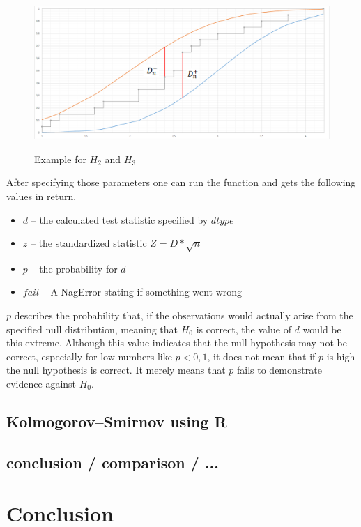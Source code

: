 \documentclass{article}
\begin{document}
\begin{figure}[here]
\caption{Example for $H_2$ and $H_3$}
\center
\includegraphics[width=.99\textwidth]{figures/diagramKSd-d+.png}
\label{fig:2}
\end{figure}
\newpage

After specifying those parameters one can run the function and gets the following values in return.
\begin{itemize}
\item $d$ -- the calculated test statistic specified by $dtype$
\item $z$ -- the standardized  statistic $Z=D*\sqrt n$
\item $p$ -- the probability for $d$
\item $fail$ -- A NagError stating if something went wrong
\end{itemize}
$p$ describes the probability that, if the observations would actually arise from the specified null distribution, meaning that $H_0$ is correct, the value of $d$ would be this extreme. Although this value indicates that the null hypothesis may not be correct, especially for low numbers like $p<0,1$, it does not mean that if $p$ is high the null hypothesis is correct. It merely means that $p$ fails to demonstrate evidence against $H_0$.

\subsection{Kolmogorov–Smirnov using R}
\subsection{conclusion / comparison / ...}

\section{Conclusion}


\newpage
\nocite{*}


\end{document}
